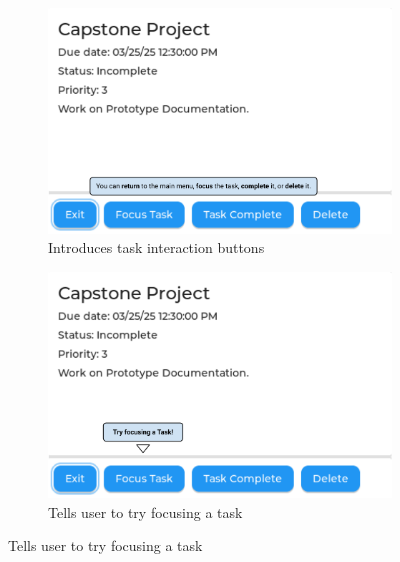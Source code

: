 \begin{figure}
    \begin{subfigure}{0.5\textwidth}
        \includegraphics[width = \textwidth]{task_buttons.png}
        \caption{Introduces task interaction buttons}
    \end{subfigure}
    \begin{subfigure}{0.5\textwidth}
        \includegraphics[width = \textwidth]{try_focus.png}
        \caption{Tells user to try focusing a task}
    \end{subfigure}
\end{figure}
